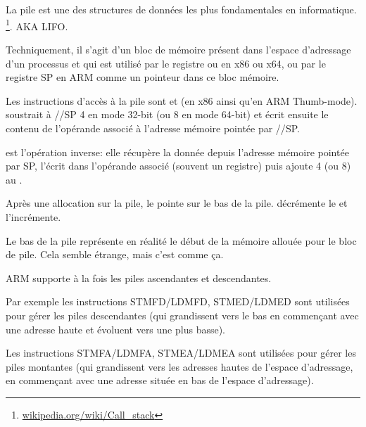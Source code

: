 \section{\Stack}
\label{sec:stack}
\myindex{\Stack}

La pile est une des structures de données les plus fondamentales en informatique.
\footnote{\href{http://go.yurichev.com/17119}{wikipedia.org/wiki/Call\_stack}}.
\ac{AKA} \ac{LIFO}.

Techniquement, il s'agit d'un bloc de mémoire présent dans l'espace d'adressage
d'un processus et qui est utilisé par le registre \ESP ou \RSP en x86 ou x64,
ou par le registre \ac{SP} en ARM comme un pointeur dans ce bloc mémoire.

Les instructions d'accès à la pile sont \PUSH et \POP (en x86 ainsi qu'en ARM Thumb-mode).
\PUSH soustrait à \ESP/\RSP/\ac{SP} 4 en mode 32-bit (ou 8 en mode 64-bit) et écrit
ensuite le contenu de l'opérande associé à l'adresse mémoire pointée par \ESP/\RSP/\ac{SP}.

\POP est l'opération inverse: elle récupère la donnée depuis l'adresse mémoire pointée par \ac{SP},
l'écrit dans l'opérande associé (souvent un registre) puis ajoute 4 (ou 8) au .

Après une allocation sur la pile, le  pointe sur le bas de la pile.
\PUSH décrémente le  et \POP l'incrémente.

Le bas de la pile représente en réalité le début de la mémoire allouée pour
le bloc de pile. Cela semble étrange, mais c'est comme ça.

ARM supporte à la fois les piles ascendantes et descendantes.


Par exemple les instructions \ac{STMFD}/\ac{LDMFD}, \ac{STMED}/\ac{LDMED} sont utilisées pour gérer les piles
descendantes (qui grandissent vers le bas en commençant avec une adresse haute et évoluent vers une plus basse).

Les instructions \ac{STMFA}/\ac{LDMFA}, \ac{STMEA}/\ac{LDMEA} sont utilisées pour gérer les piles montantes
(qui grandissent vers les adresses hautes de l'espace d'adressage, en commençant
avec une adresse située en bas de l'espace d'adressage).

